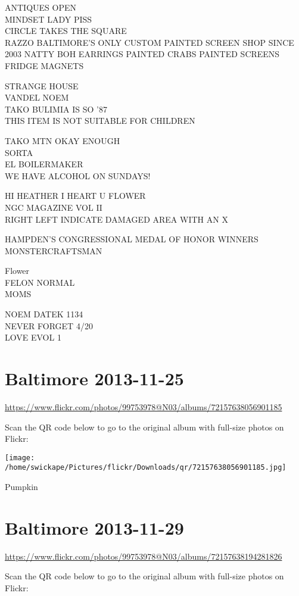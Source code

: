 \documentclass[10pt,letterpaper]{article}
\begin{document}
ANTIQUES OPEN\\
MINDSET LADY PISS\\
CIRCLE TAKES THE SQUARE\\
RAZZO BALTIMORE'S ONLY CUSTOM PAINTED SCREEN SHOP SINCE 2003 NATTY BOH EARRINGS PAINTED CRABS PAINTED SCREENS FRIDGE MAGNETS

STRANGE HOUSE\\
VANDEL NOEM\\
TAKO BULIMIA IS SO '87\\
THIS ITEM IS NOT SUITABLE FOR CHILDREN

TAKO MTN OKAY ENOUGH\\
SORTA\\
EL BOILERMAKER\\
WE HAVE ALCOHOL ON SUNDAYS!

HI HEATHER I HEART U FLOWER\\
NGC MAGAZINE VOL II\\
RIGHT LEFT INDICATE DAMAGED AREA WITH AN X

HAMPDEN'S CONGRESSIONAL MEDAL OF HONOR WINNERS\\
MONSTERCRAFTSMAN

Flower\\
FELON NORMAL\\
MOMS

NOEM DATEK 1134\\
NEVER FORGET 4/20\\
LOVE EVOL 1


\section*{Baltimore 2013-11-25}

\url{https://www.flickr.com/photos/99753978@N03/albums/72157638056901185}

Scan the QR code below to go to the original album with full-size photos on Flickr:

\texttt{[image: /home/swickape/Pictures/flickr/Downloads/qr/72157638056901185.jpg]}


Pumpkin


\section*{Baltimore 2013-11-29}

\url{https://www.flickr.com/photos/99753978@N03/albums/72157638194281826}

Scan the QR code below to go to the original album with full-size photos on Flickr:
\end{document}
